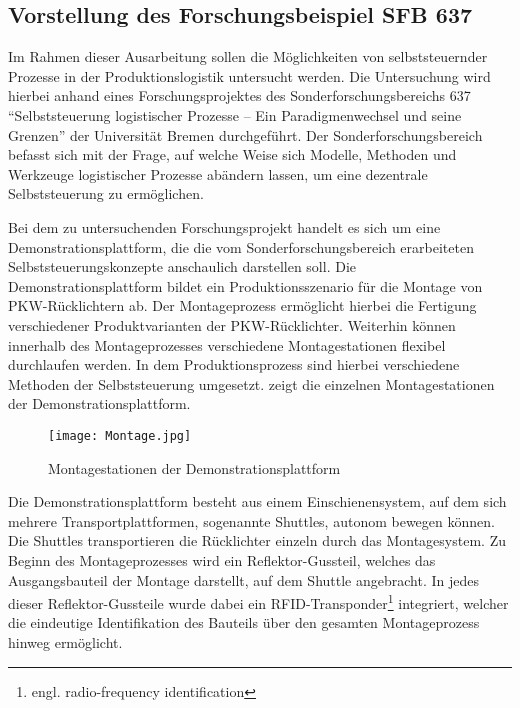 \subsection{Vorstellung des Forschungsbeispiel SFB 637}
\label{sec:Forschungsbeispiel_SFB}
Im Rahmen dieser Ausarbeitung sollen die Möglichkeiten von selbststeuernder
Prozesse in der Produktionslogistik untersucht werden. Die Untersuchung wird
hierbei anhand eines Forschungsprojektes des Sonderforschungsbereichs 637
"`Selbststeuerung logistischer Prozesse – Ein Paradigmenwechsel und seine
Grenzen"' der Universität Bremen durchgeführt. Der Sonderforschungsbereich
befasst sich mit der Frage, auf welche Weise sich Modelle, Methoden und
Werkzeuge logistischer Prozesse abändern lassen, um eine dezentrale 
Selbststeuerung zu ermöglichen.

Bei dem zu untersuchenden Forschungsprojekt handelt es sich um eine
Demonstrationsplattform, die die vom Sonderforschungsbereich erarbeiteten
Selbststeuerungskonzepte anschaulich darstellen soll. Die
Demonstrationsplattform bildet ein Produktionsszenario für die Montage von
PKW-Rücklichtern ab. Der Montageprozess ermöglicht hierbei die Fertigung
verschiedener Produktvarianten der PKW-Rücklichter. Weiterhin können innerhalb
des Montageprozesses verschiedene Montagestationen flexibel durchlaufen werden.
In dem Produktionsprozess sind hierbei verschiedene Methoden der
Selbststeuerung umgesetzt.  zeigt die einzelnen
Montagestationen der Demonstrationsplattform.

\begin{figure}[htb] 
\centering
\texttt{[image: Montage.jpg]}
\caption[Montagestation]{Montagestationen der Demonstrationsplattform\protect\footnotemark}
\label{fig:Montagestation}
\end{figure}

Die Demonstrationsplattform besteht aus einem Einschienensystem, auf dem sich
mehrere Transportplattformen, sogenannte Shuttles, autonom bewegen können. Die
Shuttles transportieren die Rücklichter einzeln durch das Montagesystem. Zu
Beginn des Montageprozesses wird ein Reflektor-Gussteil, welches das
Ausgangsbauteil der Montage darstellt, auf dem Shuttle angebracht. In jedes
dieser Reflektor-Gussteile wurde dabei ein RFID-Transponder\footnote{engl.
radio-frequency identification} integriert, welcher die eindeutige
Identifikation des Bauteils über den gesamten Montageprozess hinweg ermöglicht.

